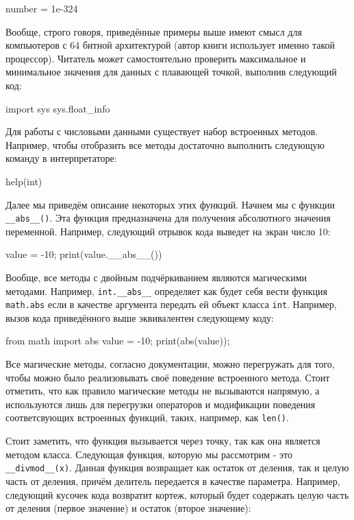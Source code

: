 \begin{python}
number = 1e-324
\end{python}

Вообще, строго говоря, приведённые примеры выше имеют смысл для компьютеров с 64 
битной архитектурой (автор книги использует именно такой процессор). Читатель
может самостоятельно проверить максимальное и минимальное значения для данных с плавающей 
точкой, выполнив следующий код:

\begin{python}
import sys
sys.float_info
\end{python}

Для работы с числовыми данными существует набор встроенных методов. Например, чтобы отобразить 
все методы достаточно выполнить следующую команду в интерпретаторе:

\begin{python}
help(int)
\end{python}

Далее мы приведём описание некоторых этих функций. Начнем мы с функции \texttt{\_\_abs\_\_()}. Эта функция 
предназначена для получения абсолютного значения переменной. Например, следующий отрывок кода
выведет на экран число 10: 

\begin{python}
value = -10;
print(value.__abs__())
\end{python} 

Вообще, все методы с двойным подчёркиванием являются магическими методами. Например, \texttt{int.\_\_abs\_\_} 
определяет как будет себя вести функция \texttt{math.abs} если в качестве аргумента передать ей
объект класса \texttt{int}. Например, вызов кода приведённого выше эквивалентен следующему коду:

\begin{python}
from math import abs
value = -10;
print(abs(value));
\end{python} 

Все магические методы, согласно документации, можно перегружать для того, чтобы можно было реализовывать
своё поведение встроенного метода. Стоит отметить, что как правило магические методы не вызываются
напрямую, а используются лишь для перегрузки операторов и модификации поведения соответсвующих
встроенных функций, таких, например, как \texttt{len()}.

Стоит заметить, что функция вызывается через точку, так как она является методом класса. 
Следующая функция, которую мы рассмотрим - это \texttt{\_\_divmod\_\_(x)}. Данная функция 
возвращает как остаток от деления, так и целую часть от деления, причём делитель передается 
в качестве параметра. Например, следующий кусочек кода возвратит кортеж, который будет содержать 
целую часть от деления (первое значение) и остаток (второе значение):

